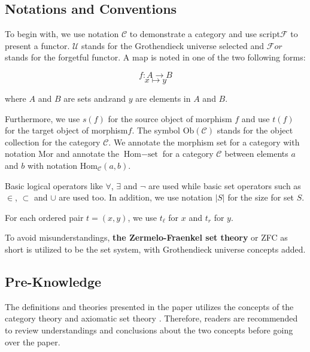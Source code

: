 \documentclass{aims}
\numberwithin{equation}{section}
\numberwithin{theorem}{section}	%
\numberwithin{axiom}{section}	%
\numberwithin{definition}{section}	%
\begin{document}
	\subsection{Notations and Conventions}
	
	To begin with, we use notation \(\mathcal{C}\) to demonstrate a category and use script\(\mathcal{F}\) to present a functor. \(\mathcal{U}\) stands for the Grothendieck universe selected and \(\mathcal{F}\mathit{o}\mathit{r}\) stands for the forgetful functor. A map is noted in one of the two following forms:
	
	\begin{equation*}
		f: A \to B
	\end{equation*}
	\begin{equation*}
		x\mapsto y
	\end{equation*}
	
	\noindent where \(A\) and \(B\) are sets and\(x\)and \(y\) are elements in \(A\) and \(B\).
	
	Furthermore, we use \(s(f)\) for the source object of morphism \(f\)\textit{  }and use \(t(f)\) for the target object of morphism\(f\). The symbol \(\text{Ob}(\mathcal{C})\) stands for the object collection for the category \(\mathcal{C}\). We annotate the morphism set for a category with notation \(\text{Mor}\) and annotate the \(\text{Hom}-\text{set}\) for a category \(\mathcal{C}\) between elements \(a\) and \(b\) with notation \(\text{Hom}_{\mathcal{C}}(a,b)\).
	
	Basic logical operators like \(\forall\), \(\exists\) and \(\neg\) are used while basic set operators such as \(\in\), \(\subset\) and \(\cup\) are used too. In addition, we use notation \(|S|\) for the size for set \(S\).
	
	For each ordered pair \(t=(x,y)\), we use \(t_{\ell }\) for \(x\) and \(t_{\mathit{r}}\) for \(y\).
	
	To avoid misunderstandings, \textbf{the Zermelo-Fraenkel set theory} or ZFC as short is utilized to be the set system, with Grothendieck universe concepts added. \cite{Li2019}
	
	\subsection{Pre-Knowledge}
	
	The definitions and theories presented in the paper utilizes the concepts of the category theory \cite{Li2019} and axiomatic set theory \cite{Li2019}. Therefore, readers are recommended to review understandings and conclusions about the two concepts before going over the paper.
	
\end{document}
